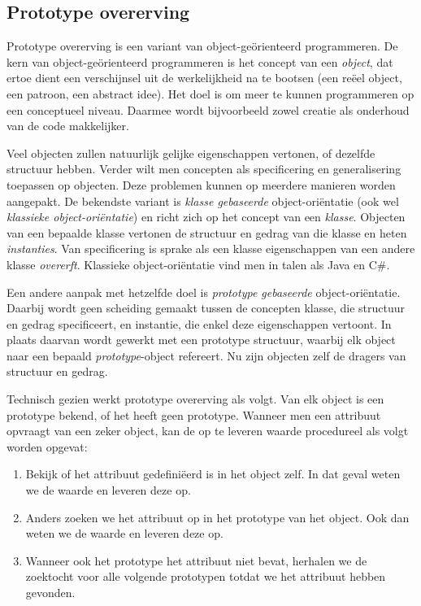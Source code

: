 
\subsection{Prototype overerving}

Prototype overerving is een variant van object-geörienteerd programmeren. De kern van object-geörienteerd programmeren is het concept van een \emph{object}, dat ertoe dient een verschijnsel uit de werkelijkheid na te bootsen (een reëel object, een patroon, een abstract idee). Het doel is om meer te kunnen programmeren op een conceptueel niveau. Daarmee wordt bijvoorbeeld zowel creatie als onderhoud van de code makkelijker.

Veel objecten zullen natuurlijk gelijke eigenschappen vertonen, of dezelfde structuur hebben. Verder wilt men concepten als specificering en generalisering toepassen op objecten. Deze problemen kunnen op meerdere manieren worden aangepakt. De bekendste variant is \emph{klasse gebaseerde} object-oriëntatie (ook wel \emph{klassieke object-oriëntatie}) en richt zich op het concept van een \emph{klasse}. Objecten van een bepaalde klasse vertonen de structuur en gedrag van die klasse en heten \emph{instanties}. Van specificering is sprake als een klasse eigenschappen van een andere klasse \emph{overerft}. Klassieke object-oriëntatie vind men in talen als Java en C\#.

Een andere aanpak met hetzelfde doel is \emph{prototype gebaseerde} object-oriëntatie. Daarbij wordt geen scheiding gemaakt tussen de concepten klasse, die structuur en gedrag specificeert, en instantie, die enkel deze eigenschappen vertoont. In plaats daarvan wordt gewerkt met een prototype structuur, waarbij elk object naar een bepaald \emph{prototype}-object refereert. Nu zijn objecten zelf de dragers van structuur en gedrag.

Technisch gezien werkt prototype overerving als volgt. Van elk object is een prototype bekend, of het heeft geen prototype. Wanneer men een attribuut opvraagt van een zeker object, kan de op te leveren waarde procedureel als volgt worden opgevat:

\begin{enumerate}
  \item Bekijk of het attribuut gedefiniëerd is in het object zelf. In dat geval weten we de waarde en leveren deze op.
  \item Anders zoeken we het attribuut op in het prototype van het object. Ook dan weten we de waarde en leveren deze op.
  \item Wanneer ook het prototype het attribuut niet bevat, herhalen we de zoektocht voor alle volgende prototypen totdat we het attribuut hebben gevonden.
\end{enumerate}

